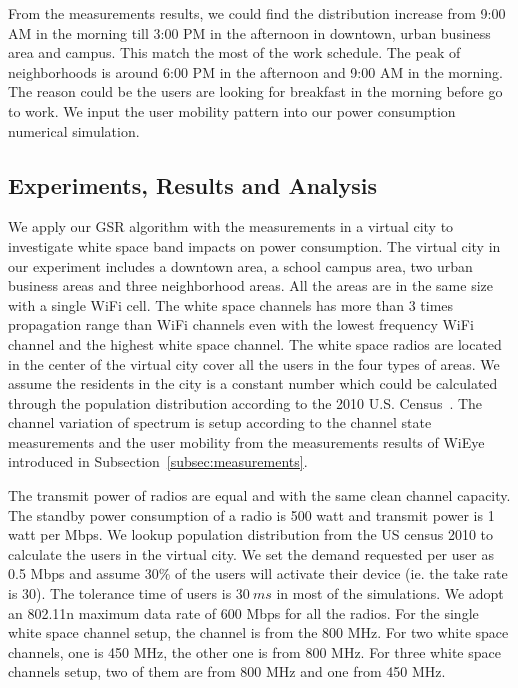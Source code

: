 From the measurements results, we could find the distribution increase from 9:00 AM in the morning till 
3:00 PM in the afternoon in downtown, urban business area and campus. 
This match the most of the work schedule.
The peak of neighborhoods is around 6:00 PM in the afternoon and 9:00 AM in the morning. 
The reason could be the users are looking for breakfast in the morning before go to work.
We input the user mobility pattern into our power consumption numerical simulation.



\subsection{Experiments, Results and Analysis}
\label{subsec:experimentsetup}

We apply our GSR algorithm with the measurements in a virtual city to investigate white space band 
impacts on power consumption. 
The virtual city in our experiment includes a downtown area, a school campus area, two urban business 
areas and three neighborhood areas. 
All the areas are in the same size with a single WiFi cell. 
The white space channels has more than 3 times propagation range than WiFi channels 
even with the lowest frequency WiFi channel and the highest white space channel.
The white space radios are located in the center of the virtual city cover all the users in the 
four types of areas.
We assume the residents in the city is a constant number which could be calculated through the 
population distribution according to the 2010 U.S. Census~\cite{uscensus}. 
The channel variation of spectrum is setup according to the channel state measurements
and the user mobility from the measurements results of WiEye introduced in 
Subsection~\ref{subsec:measurements}.

The transmit power of radios are equal and with the same clean channel capacity. 
The standby power consumption of a radio is 500 watt and transmit power is 1 watt per Mbps.
We lookup population distribution from the US census 2010 to calculate the users in the 
virtual city. We set the demand requested per user as 0.5 Mbps and assume 30\% of the users will 
activate their device (ie. the take rate is 30). The tolerance time of users is $30\ ms$ in most of 
the simulations. We adopt an 802.11n maximum data rate of 600 Mbps for all the radios. 
For the single white space channel setup, the channel is from the 800 MHz. For two white space channels, 
one is 450 MHz, the other one is from 800 MHz. For three white space channels setup, two of them are from 
800 MHz and one from 450 MHz.

